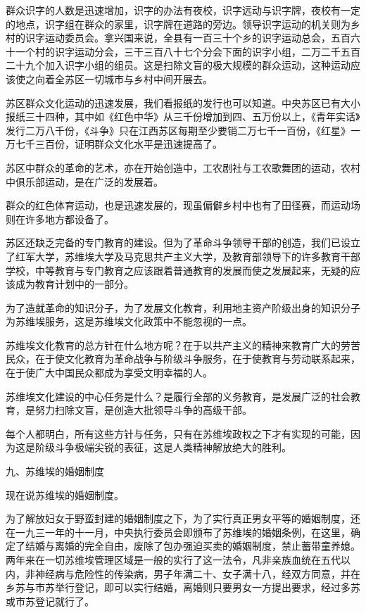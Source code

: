 群众识字的人数是迅速增加，识字的办法有夜校，识字远动与识字牌，夜校有一定的地点，识字组在群众的家里，识字牌在道路的旁边。领导识字运动的机关则为乡村的识字运动委员会。拿兴国来说，全县有一百三十个乡的识字运动总会，五百六十一个村的识字运动分会，三干三百八十七个分会下面的识字小组，二万二千五百二十九个加入识字小组的组员。这是扫除文盲的极大规模的群众运动，这种运动应该使之向着全苏区一切城市与乡村中间开展去。

苏区群众文化运动的迅速发展，我们看报纸的发行也可以知道。中央苏区已有大小报纸三十四种，其中如《红色中华》从三千份增加到四、五万份以上，《青年实话》发行二万八千份，《斗争》只在江西苏区每期至少要销二万七千一百份，《红星》一万七千三百份，证明群众文化水平是迅速提高了。

苏区中群众的革命的艺术，亦在开始创造中，工农剧社与工农歌舞团的运动，农村中俱乐部运动，是在广泛的发展着。

群众的红色体育运动，也是迅速发展的，现虽偏僻乡村中也有了田径赛，而运动场则在许多地方都设备了。

苏区还缺乏完备的专门教育的建设。但为了革命斗争领导干部的创造，我们已设立了红军大学，苏维埃大学及马克思共产主义大学，及教育部领导下的许多教育干部学校，中等教育与专门教育之应该跟着普通教育的发展而使之发展起来，无疑的应该成为教育计划中的一部分。

为了造就革命的知识分子，为了发展文化教育，利用地主资产阶级出身的知识分子为苏维埃服务，这是苏维埃文化政策中不能忽视的一点。

苏维埃文化教育的总方针在什么地方呢？在于以共产主义的精神来教育广大的劳苦民众，在于使文化教育为革命战争与阶级斗争服务，在于使教育与劳动联系起来，在于使广大中国民众都成为享受文明幸福的人。

苏维埃文化建设的中心任务是什么？是履行全部的义务教育，是发展广泛的社会教育，是努力扫除文盲，是创造大批领导斗争的高级干部。

每个人都明白，所有这些方针与任务，只有在苏维埃政权之下才有实现的可能，因为这是阶级斗争极端尖锐的表征，这是人类精神解放绝大的胜利。

九、苏维埃的婚姻制度

现在说苏维埃的婚姻制度。

为了解放妇女于野蛮封建的婚姻制度之下，为了实行真正男女平等的婚姻制度，还在一九三一年的十一月，中央执行委员会即颁布了苏维埃的婚姻条例，在这里，确定了结婚与离婚的完全自由，废除了包办强迫买卖的婚姻制度，禁止蓄带童养媳。两年来在一切苏维埃管理区域是一般的实行了这一法令，凡非亲族血统在五代以内，非神经病与危险性的传染病，男子年满二十、女子满十八，经双方同意，并在乡苏与市苏举行登记，即可以实行结婚，离婚则只要男女一方提出要求，经过多苏或市苏登记就行了。

